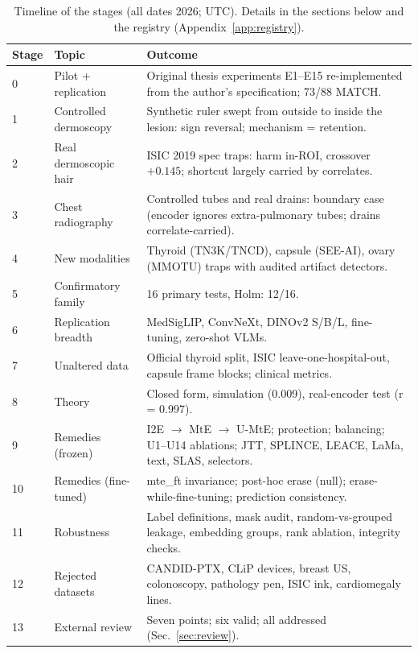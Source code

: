 \documentclass[10pt,a4paper]{article}
\begin{document}
\begin{table}[H]\centering\small
\caption{Timeline of the stages (all dates 2026; UTC). Details in the sections below and the registry (Appendix~\ref{app:registry}).}
\begin{tabular}{p{0.7cm}p{3.6cm}p{11.2cm}}\toprule
Stage & Topic & Outcome \\\midrule
0 & Pilot + replication & Original thesis experiments E1--E15 re-implemented from the author's specification; 73/88 MATCH. \\
1 & Controlled dermoscopy & Synthetic ruler swept from outside to inside the lesion: sign reversal; mechanism = retention. \\
2 & Real dermoscopic hair & ISIC 2019 spec traps: harm in-ROI, crossover $+0.145$; shortcut largely carried by correlates. \\
3 & Chest radiography & Controlled tubes and real drains: boundary case (encoder ignores extra-pulmonary tubes; drains correlate-carried). \\
4 & New modalities & Thyroid (TN3K/TNCD), capsule (SEE-AI), ovary (MMOTU) traps with audited artifact detectors. \\
5 & Confirmatory family & 16 primary tests, Holm: 12/16. \\
6 & Replication breadth & MedSigLIP, ConvNeXt, DINOv2 S/B/L, fine-tuning, zero-shot VLMs. \\
7 & Unaltered data & Official thyroid split, ISIC leave-one-hospital-out, capsule frame blocks; clinical metrics. \\
8 & Theory & Closed form, simulation (0.009), real-encoder test (r = 0.997). \\
9 & Remedies (frozen) & I2E $\to$ MtE $\to$ U-MtE; protection; balancing; U1--U14 ablations; JTT, SPLINCE, LEACE, LaMa, text, SLAS, selectors. \\
10 & Remedies (fine-tuned) & mte\_ft invariance; post-hoc erase (null); erase-while-fine-tuning; prediction consistency. \\
11 & Robustness & Label definitions, mask audit, random-vs-grouped leakage, embedding groups, rank ablation, integrity checks. \\
12 & Rejected datasets & CANDID-PTX, CLiP devices, breast US, colonoscopy, pathology pen, ISIC ink, cardiomegaly lines. \\
13 & External review & Seven points; six valid; all addressed (Sec.~\ref{sec:review}). \\\bottomrule
\end{tabular}\end{table}
\end{document}

